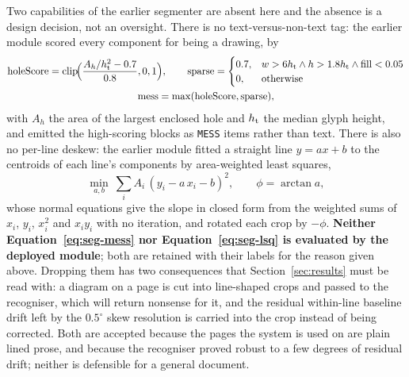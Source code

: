 Two capabilities of the earlier segmenter are absent here and the absence is a design decision, not an oversight.
There is no text-versus-non-text tag: the earlier module scored every component for being a drawing, by
\begin{equation}
\begin{gathered}
\mathrm{holeScore}=\mathrm{clip}\!\Bigl(\frac{A_h/h_{\mathrm{t}}^2-0.7}{0.8},0,1\Bigr),\qquad
\mathrm{sparse}=\begin{cases}0.7,&w>6h_{\mathrm{t}}\wedge h>1.8h_{\mathrm{t}}\wedge\mathrm{fill}<0.05\\0,&\text{otherwise}\end{cases}\\
\mathrm{mess}=\max(\mathrm{holeScore},\mathrm{sparse}),
\end{gathered}
\label{eq:seg-mess}
\end{equation}
with $A_h$ the area of the largest enclosed hole and $h_{\mathrm{t}}$ the median glyph height, and emitted the high-scoring blocks as \texttt{MESS} items rather than text.
There is also no per-line deskew: the earlier module fitted a straight line $y=ax+b$ to the centroids of each line's components by area-weighted least squares,
\begin{equation}
\min_{a,b}\ \sum_i A_i\,(y_i-a\,x_i-b)^2,\qquad \phi=\arctan a,
\label{eq:seg-lsq}
\end{equation}
whose normal equations give the slope in closed form from the weighted sums of $x_i$, $y_i$, $x_i^2$ and $x_iy_i$ with no iteration, and rotated each crop by $-\phi$.
\textbf{Neither Equation~\ref{eq:seg-mess} nor Equation~\ref{eq:seg-lsq} is evaluated by the deployed module}; both are retained with their labels for the reason given above.
Dropping them has two consequences that Section~\ref{sec:results} must be read with: a diagram on a page is cut into line-shaped crops and passed to the recogniser, which will return nonsense for it, and the residual within-line baseline drift left by the $0.5^\circ$ skew resolution is carried into the crop instead of being corrected.
Both are accepted because the pages the system is used on are plain lined prose, and because the recogniser proved robust to a few degrees of residual drift; neither is defensible for a general document.

\label{fig:seg-result}

